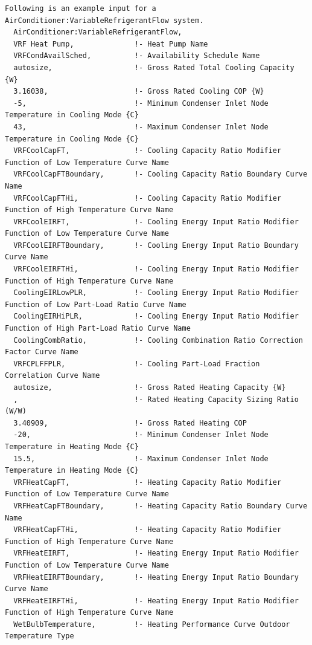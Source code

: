\begin{lstlisting}
Following is an example input for a AirConditioner:VariableRefrigerantFlow system.
  AirConditioner:VariableRefrigerantFlow,
  VRF Heat Pump,              !- Heat Pump Name
  VRFCondAvailSched,          !- Availability Schedule Name
  autosize,                   !- Gross Rated Total Cooling Capacity {W}
  3.16038,                    !- Gross Rated Cooling COP {W}
  -5,                         !- Minimum Condenser Inlet Node Temperature in Cooling Mode {C}
  43,                         !- Maximum Condenser Inlet Node Temperature in Cooling Mode {C}
  VRFCoolCapFT,               !- Cooling Capacity Ratio Modifier Function of Low Temperature Curve Name
  VRFCoolCapFTBoundary,       !- Cooling Capacity Ratio Boundary Curve Name
  VRFCoolCapFTHi,             !- Cooling Capacity Ratio Modifier Function of High Temperature Curve Name
  VRFCoolEIRFT,               !- Cooling Energy Input Ratio Modifier Function of Low Temperature Curve Name
  VRFCoolEIRFTBoundary,       !- Cooling Energy Input Ratio Boundary Curve Name
  VRFCoolEIRFTHi,             !- Cooling Energy Input Ratio Modifier Function of High Temperature Curve Name
  CoolingEIRLowPLR,           !- Cooling Energy Input Ratio Modifier Function of Low Part-Load Ratio Curve Name
  CoolingEIRHiPLR,            !- Cooling Energy Input Ratio Modifier Function of High Part-Load Ratio Curve Name
  CoolingCombRatio,           !- Cooling Combination Ratio Correction Factor Curve Name
  VRFCPLFFPLR,                !- Cooling Part-Load Fraction Correlation Curve Name
  autosize,                   !- Gross Rated Heating Capacity {W}
  ,                           !- Rated Heating Capacity Sizing Ratio (W/W)
  3.40909,                    !- Gross Rated Heating COP
  -20,                        !- Minimum Condenser Inlet Node Temperature in Heating Mode {C}
  15.5,                       !- Maximum Condenser Inlet Node Temperature in Heating Mode {C}
  VRFHeatCapFT,               !- Heating Capacity Ratio Modifier Function of Low Temperature Curve Name
  VRFHeatCapFTBoundary,       !- Heating Capacity Ratio Boundary Curve Name
  VRFHeatCapFTHi,             !- Heating Capacity Ratio Modifier Function of High Temperature Curve Name
  VRFHeatEIRFT,               !- Heating Energy Input Ratio Modifier Function of Low Temperature Curve Name
  VRFHeatEIRFTBoundary,       !- Heating Energy Input Ratio Boundary Curve Name
  VRFHeatEIRFTHi,             !- Heating Energy Input Ratio Modifier Function of High Temperature Curve Name
  WetBulbTemperature,         !- Heating Performance Curve Outdoor Temperature Type

\end{lstlisting}
